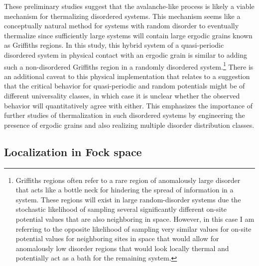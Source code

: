 These preliminary studies suggest that the avalanche-like process is likely a viable mechanism for thermalizing disordered systems. This mechanism seems like a conceptually natural method for systems with random disorder to eventually thermalize since sufficiently large systems will contain large ergodic grains known as Griffiths regions. In this study, this hybrid system of a quasi-periodic disordered system in physical contact with an ergodic grain is similar to adding such a non-disordered Griffiths region in a randomly disordered system.\footnote{Griffiths regions often refer to a rare region of anomalously large disorder that acts like a bottle neck for hindering the spread of information in a system. These regions will exist in large random-disorder systems due the stochastic likelihood of sampling several significantly different on-site potential values that are also neighboring in space. However, in this case I am referring to the opposite likelihood of sampling very similar values for on-site potential values for neighboring sites in space that would allow for anomalously low disorder regions that would look locally thermal and potentially act as a bath for the remaining system.}  There is an additional caveat to this physical implementation that relates to a suggestion that the critical behavior for quasi-periodic and random potentials might be of different universality classes\cite{Khemani2017a,Zhang2018}, in which case it is unclear whether the observed behavior will quantitatively agree with either. This emphasizes the importance of further studies of thermalization in such disordered systems by engineering the presence of ergodic grains and also realizing multiple disorder distribution classes.


%

\subsection{Localization in Fock space}

